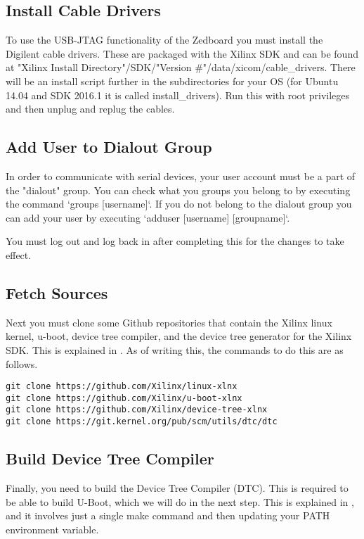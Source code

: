 \documentclass[thesis.tex]{subfile}
\begin{document}
\subsection{Install Cable Drivers}
To use the USB-JTAG functionality of the Zedboard you must install the Digilent cable drivers. These are packaged with the Xilinx SDK and can be found at "Xilinx Install Directory"/SDK/"Version \#"/data/xicom/cable\_drivers. There will be an install script further in the subdirectories for your OS (for Ubuntu 14.04 and SDK 2016.1 it is called install\_drivers). Run this with root privileges and then unplug and replug the cables.

\subsection{Add User to Dialout Group}
In order to communicate with serial devices, your user account must be a part of the "dialout" group. You can check what you groups you belong to by executing the command `groups [username]`. If you do not belong to the dialout group you can add your user by executing `adduser [username] [groupname]`.

You must log out and log back in after completing this for the changes to take effect.

\subsection{Fetch Sources}
Next you must clone some Github repositories that contain the Xilinx linux kernel, u-boot, device tree compiler, and the device tree generator for the Xilinx SDK. This is explained in \cite{FetchSources}. As of writing this, the commands to do this are as follows.

\begin{lstlisting}
git clone https://github.com/Xilinx/linux-xlnx
git clone https://github.com/Xilinx/u-boot-xlnx
git clone https://github.com/Xilinx/device-tree-xlnx
git clone https://git.kernel.org/pub/scm/utils/dtc/dtc
\end{lstlisting}


\subsection{Build Device Tree Compiler}
Finally, you need to build the Device Tree Compiler (DTC). This is required to be able to build U-Boot, which we will do in the next step. This is explained in \cite{BuildDTC}, and it involves just a single make command and then updating your PATH environment variable.
\end{document}
